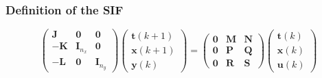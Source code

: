 \begin{frame}
	\frametitle{Definition of the SIF}
	\begin{equation} \label{sifdef}
		\begin{pmatrix}
			\boldsymbol{J} & \boldsymbol{0} & \boldsymbol{0} \\
			\boldsymbol{-K} & \boldsymbol{I}_{n_x} & \boldsymbol{0} \\
			\boldsymbol{-L} & \boldsymbol{0} & \boldsymbol{I}_{n_y} 
		\end{pmatrix}
		\begin{pmatrix}
			\boldsymbol{t} (k+1)  \\
			\boldsymbol{x} (k+1)  \\
			\boldsymbol{y} (k) 
		\end{pmatrix}
		=
		\begin{pmatrix}
			\boldsymbol{0} & \boldsymbol{M} & \boldsymbol{N} \\
			\boldsymbol{0} & \boldsymbol{P} & \boldsymbol{Q} \\
			\boldsymbol{0} & \boldsymbol{R} & \boldsymbol{S} 
		\end{pmatrix}
		\begin{pmatrix}
			\boldsymbol{t} (k)  \\
			\boldsymbol{x} (k)  \\
			\boldsymbol{u} (k) 
		\end{pmatrix}
	\end{equation}

\end{frame}

